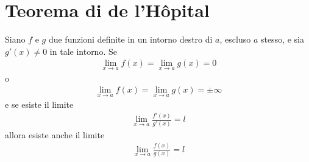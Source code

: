 \documentclass{book}
\begin{document}
\section{Teorema di de l'Hôpital}
\begin{theorem}
    Siano \(f\) e \(g\) due funzioni definite in un intorno destro di \(a\), escluso \(a\) stesso, e sia \(g'(x) \neq 0\) in tale intorno. Se
    \begin{align*}
        \lim_{x \to a} f(x) = \lim_{x \to a} g(x) = 0
    \end{align*}
    o
    \begin{align*}
        \lim_{x \to a} f(x) = \lim_{x \to a} g(x) = \pm \infty
    \end{align*}
    e se esiste il limite
    \begin{align*}
        \lim_{x \to a} \frac{f'(x)}{g'(x)} = l
    \end{align*}
    allora esiste anche il limite
    \begin{align*}
        \lim_{x \to a} \frac{f(x)}{g(x)} = l
    \end{align*}
\end{theorem}
\end{document}
